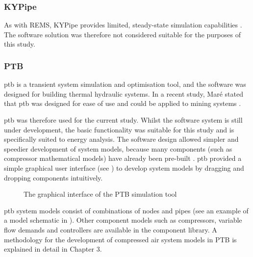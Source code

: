 \subsubsection{KYPipe}
As with REMS, KYPipe provides limited, steady-state simulation capabilities \cite{vanNiekerk2012Value}. The software solution was therefore not considered suitable for the purposes of this study.
\subsubsection{PTB}
 \gls*{ptb} is a transient system simulation and optimisation tool, and the software was designed for building thermal hydraulic systems. In a recent study, Maré stated that \gls{ptb} was designed for ease of use and could be applied to mining systems \cite{Mare2016PhD}.  
 \par 
 \clearpage
 \gls{ptb} was therefore used for the current study. Whilst the software system is still under development, the basic functionality was suitable for this study and is specifically suited to energy analysis. The software design allowed simpler and speedier development of system models, because many components (such as compressor mathematical models) have already been pre-built \cite{Mare2016PhD}.  \gls{ptb} provided a simple graphical user interface (see ) to develop system models by dragging and dropping components intuitively.
 \par 
\begin{figure}[h!]
 	\centering
 	\caption{The graphical interface of the PTB simulation tool}
 	\label{fig: PTB UI}
 \end{figure}
 \gls{ptb} system models consist of combinations of nodes and pipes (see an example of a model schematic in ). Other component models such as compressors, variable flow demands and controllers are available in the component library. A methodology for the development of compressed air system models in PTB is explained in detail in Chapter 3.
